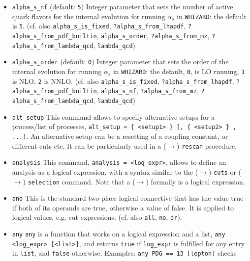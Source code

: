 \documentclass[12pt]{book}
\newcommand{\ttt}[1]{\texttt{#1}}
\newcommand{\whizard}{\texttt{WHIZARD}}
\begin{document}
\begin{itemize}
\item
\ttt{alpha\_s\_nf} \qquad (default: \ttt{5}) \newline 
Integer parameter that sets the number of active quark flavors for the
internal evolution for running $\alpha_s$ in \whizard: the default is
\ttt{5}. (cf. also \ttt{alpha\_s\_is\_fixed},
\ttt{?alpha\_s\_from\_lhapdf}, \ttt{?alpha\_s\_from\_pdf\_builtin},
\ttt{alpha\_s\_order}, \ttt{?alpha\_s\_from\_mz}, \newline 
\ttt{?alpha\_s\_from\_lambda\_qcd}, \ttt{lambda\_qcd}) 
\item
\ttt{alpha\_s\_order} \qquad (default: \ttt{0}) \newline 
Integer parameter that sets the order of the internal evolution for
running $\alpha_s$ in \whizard: the default, \ttt{0}, is LO running,
\ttt{1} is NLO, \ttt{2} is NNLO. (cf. also
\ttt{alpha\_s\_is\_fixed}, \ttt{?alpha\_s\_from\_lhapdf},
\ttt{?alpha\_s\_from\_pdf\_builtin}, \ttt{alpha\_s\_nf},
\ttt{?alpha\_s\_from\_mz}, \newline
\ttt{?alpha\_s\_from\_lambda\_qcd}, \ttt{lambda\_qcd}) 
\item
\ttt{alt\_setup} \newline
This command allows to specify alternative setups for a process/list
of processes, \ttt{alt\_setup = \{ <setup1> \} [, \{ <setup2> \} ,
  ...]}. An alternative setup can be a resetting of a coupling
constant, or different cuts etc. It can be particularly used in a
($\to$) \ttt{rescan} procedure. 
\item
\ttt{analysis} \newline
This command, \ttt{analysis = <log\_expr>}, allows to define an
analysis as a logical expression, with a syntax similar to the ($\to$)
\ttt{cuts} or ($\to$) \ttt{selection} command. Note that a ($\to$)
formally is a logical expression. 
\item
\ttt{and} \newline
This is the standard two-place logical connective that has the value
true if both of its operands are true, otherwise a value of false. It
is applied to logical values, e.g. cut expressions. (cf. also
\ttt{all}, \ttt{no}, \ttt{or}).
\item
\ttt{any} \newline
\ttt{any} is a function that works on a logical expression and a list, 
\ttt{any <log\_expr> [<list>]}, and returns \ttt{true} if
\ttt{log\_expr} is fulfilled for any entry in \ttt{list}, and
\ttt{false} otherwise. Examples: \ttt{any PDG == 13 [lepton]} checks

\end{itemize}
\end{document}
